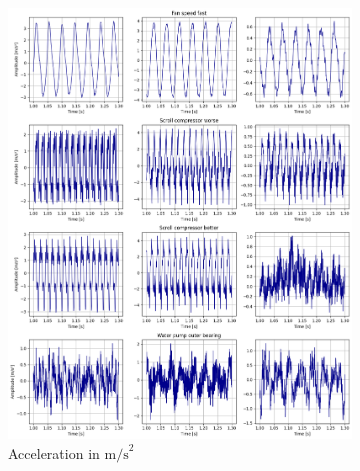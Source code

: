 \begin{figure}[ht]
    \centering
    \begin{subfigure}[b]{0.49\textwidth}
        \includegraphics[width=\textwidth]{assets/design/EDA-custom-dataset-temporal.png}
        \caption{Acceleration in $\mathrm{m/s}^2$}
        \label{fig:design:preliminary-acceleration}
    \end{subfigure}
    \hfill
    \begin{subfigure}[b]{0.49\textwidth}

\end{subfigure}
\end{figure}
